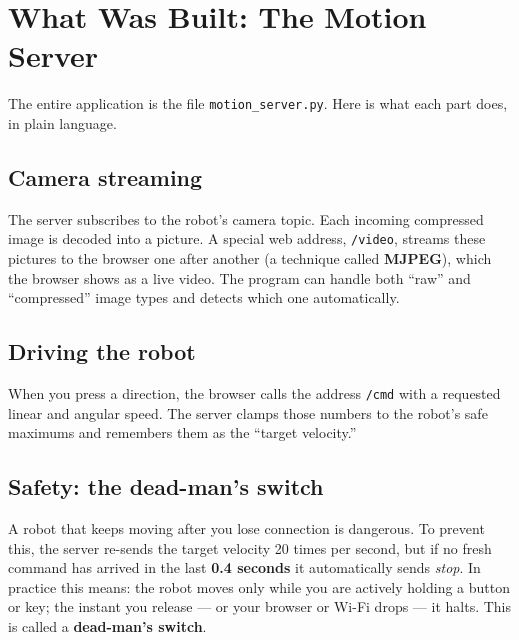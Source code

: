 \documentclass[11pt,a4paper]{article}
\newcommand{\code}[1]{\texttt{#1}}
\begin{document}
\section{What Was Built: The Motion Server}
The entire application is the file \code{motion\_server.py}. Here is what each
part does, in plain language.

\subsection{Camera streaming}
The server subscribes to the robot's camera topic. Each incoming compressed
image is decoded into a picture. A special web address, \code{/video}, streams
these pictures to the browser one after another (a technique called
\textbf{MJPEG}), which the browser shows as a live video. The program can handle
both ``raw'' and ``compressed'' image types and detects which one automatically.

\subsection{Driving the robot}
When you press a direction, the browser calls the address \code{/cmd} with a
requested linear and angular speed. The server clamps those numbers to the
robot's safe maximums and remembers them as the ``target velocity.''

\subsection{Safety: the dead-man's switch}
\label{sec:deadman}
A robot that keeps moving after you lose connection is dangerous. To prevent
this, the server re-sends the target velocity 20 times per second, but if no
fresh command has arrived in the last \textbf{0.4 seconds} it automatically
sends \emph{stop}. In practice this means: the robot moves only while you are
actively holding a button or key; the instant you release --- or your browser or
Wi-Fi drops --- it halts. This is called a \textbf{dead-man's switch}.
\end{document}
